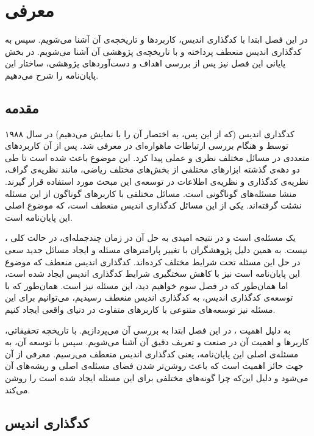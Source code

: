 \chapter{معرفی}
\label{chapter:introduction}
 در این فصل ابتدا با کدگذاری اندیس، کاربردها و تاریخچه‌ی آن آشنا می‌شویم. سپس به کدگذاری اندیس منعطف پرداخته و با تاریخچه‌ی پژوهشی آن آشنا می‌شویم. در بخش پایانی این فصل نیز پس از بررسی اهداف و دست‌آوردهای پژوهشی، ساختار این پایان‌نامه را شرح می‌دهیم.
\pagebreak

\section{مقدمه}
کدگذاری اندیس (که از این پس، به اختصار آن را با
\icod
نمایش می‌دهیم) در سال ۱۹۸۸ توسط 
و
هنگام بررسی ارتباطات ماهواره‌ای در
\cite{25}
معرفی شد. پس از آن \icod کاربردهای متعددی در مسائل مختلف نظری و عملی پیدا کرد. این موضوع باعث شده است تا طی دو دهه‌ی گذشته ابزارهای مختلفی از بخش‌های مختلف ریاضی، مانند نظریه‌ی گراف، نظریه‌ی کدگذاری و نظریه‌ی اطلاعات در توسعه‌ی این مبحث مورد استفاده قرار گیرند. \icod منشا مسئله‌های گوناگونی است. مسائل مختلفی با کاربرهای گوناگون از این مسئله نشئت گرفته‌اند. یکی از این مسائل کدگذاری اندیس منعطف است، که موضوع اصلی این پایان‌نامه است.

	\icod، یک مسئله‌ی
است و در نتیجه امیدی به حل آن در زمان چندجمله‌ای، در حالت کلی نیست. به همین دلیل پژوهشگران با تغییر پارامترهای مسئله و ایجاد مسائل جدید سعی در حل این مسئله تحت شرایط مختلف کرده‌اند. کدگذاری اندیس منعطف که موضوع این پایان‌نامه است نیز با کاهش سختگیری شرایط کدگذاری اندیس ایجاد شده است، اما همان‌طور که در فصل سوم خواهیم دید، این مسئله نیز
\nphard
است. همان‌طور که با توسعه‌ی کدگذاری اندیس، به کدگذاری اندیس منعطف رسیدیم، می‌توانیم برای  این مسئله نیز توسعه‌های متنوعی با کاربرهای متفاوت در دنیای واقعی ایجاد کنیم.

به دلیل اهمیت \icod، در این فصل ابتدا به بررسی آن می‌پردازیم. با تاریخچه تحقیقاتی، کاربرها و اهمیت آن در صنعت و تعریف دقیق آن آشنا می‌شویم. سپس با توسعه آن، به مسئله‌ی اصلی این پایان‌نامه، یعنی کدگذاری اندیس منعطف می‌رسیم. معرفی \icod از آن جهت حائز اهمیت است که باعث روشن‌تر شدن فضای مسئله‌‌ی اصلی و ریشه‌های آن می‌شود و دلیل این‌که چرا گونه‌های مختلفی برای این مسئله ایجاد شده است را روشن می‌کند.
\pagebreak
\section{کدگذاری اندیس}
